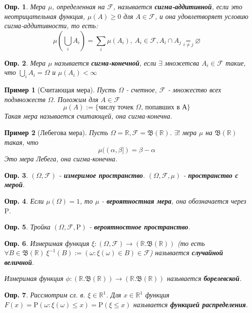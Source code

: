 \documentclass[12pt]{article}
\newtheorem{definition}{Опр.}
\newtheorem*{example}{Пример}
\theoremstyle{basic_theorem}
\theoremstyle{name_theorem}
\newcommand\defin[1]{\textbf{#1}}
\def\R{
    \mathbb{R}
}
\def\P{
    \mathrm{P}
}
\def\F{
    \mathcal{F}
}
\def\B{
    \mathfrak{B}
}
\begin{document}
\begin{definition}
    Мера $\mu$, определенная на $\F$, называется \defin{сигма-аддитивной},
    если это неотрицательная функция, $\mu(A) \geq 0$ для $A \in \F$,
    и она удовлетворяет условию сигма-аддитивности, то есть:
    $$\mu(\bigcup_iA_i) = \sum_i\mu(A_i), \ A_i \in \F, A_i \cap A_j \underset{i \neq j}{=} \varnothing $$
\end{definition}
\begin{definition}
    Мера $\mu$ называется \defin{сигма-конечной}, если $\exists$ множетсва $A_i \in \F$
    такие, что $\bigcup_iA_i = \Omega$ и $\mu(A_i) < \infty$
\end{definition}
\begin{example}[Считающая мера]
    Пусть $\Omega$ - счетное, $\F$ - множество всех подмножеств $\Omega$.
    Положим для $A \in \F$
    $$\mu(A) := \{ \mbox{числу точек $\Omega$, попавших в А}\}$$
    Такая мера называется считающей, она сигма-конечна.
\end{example}
\begin{example}[Лебегова мера]
    Пусть $\Omega = \R, \F = \B(\R)$. $\exists!$ мера
    $\mu$ на $\B(\R)$ такая, что 
    $$\mu((\alpha, \beta]) = \beta - \alpha$$
    Это мера Лебега, она сигма-конечна.
\end{example}
\begin{definition}
    $(\Omega, \F)$ - \defin{измеримое пространство}.
    $(\Omega, \F, \mu)$ - \defin{пространство с мерой}.
\end{definition}
\begin{definition}
    Если $\mu(\Omega) = 1$, то $\mu$ - \defin{вероятностная мера}, она обозначается
    через $\P$.
\end{definition}
\begin{definition}
    Тройка $(\Omega, \F, \P)$ - \defin{вероятностное пространство}.
\end{definition}
\begin{definition}
    Измеримая функция $\xi: (\Omega, \F) \rightarrow (\R. \B(\R))$
    (то есть $\forall B \in \B(\R)\ \xi^{-1}(B):=(\omega:\xi(\omega)\in B) \in \F$)
    называется \defin{случайной величной}.

    Измеримая функция $\phi:(\R. \B(\R)) \rightarrow (\R. \B(\R))$
    называется \defin{борелевской}.
\end{definition}
\begin{definition}
    Рассмотрим сл. в. $\xi \in \R^1$. Для $x \in \R^1$ функция 
    $F(x) = \P(\omega: \xi(\omega) \leq x) = \P(\xi \leq x)$ называется
    \defin{функцией распределения}.
\end{definition}
\end{document}
